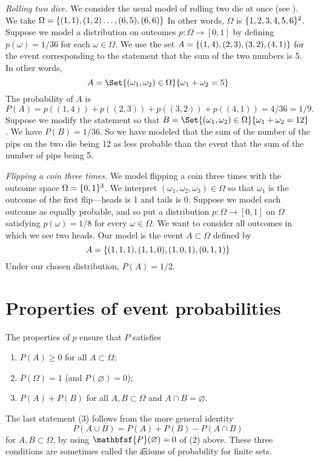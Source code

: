\textit{Rolling two dice.}
We consider the usual model of rolling two die at once (see ).
We take $\Omega  = \{(1,1), (1,2) \dots , (6,5), (6,6)\}$
In other words, $\Omega $ is $\{1,2,3,4,5,6\}^2$.
Suppose we model a distribution on outcomes $p: \Omega  \to [0,1]$ by defining $p(\omega ) = 1/36$ for each $\omega  \in \Omega $.
We use the set $A = \{(1,4), (2,3), (3, 2), (4,1)\}$ for the event corresponding to the statement that the sum of the two numbers is 5.
In other words,
\[
A = \Set{(\omega _1, \omega _2) \in \Omega }{ \omega _1 + \omega _2 = 5}
\]
The probability of $A$ is
\[
P(A) = p((1,4)) + p((2,3)) + p((3,2)) + p((4,1)) = 4/36 = 1/9.
\]
Suppose we modify the statement so that $B = \Set{(\omega _1,\omega _2) \in \Omega }{\omega _1 + \omega _2 = 12}$.
We have $P(B) = 1/36$.
So we have modeled that the sum of the number of the pips on the two die being 12 as less probable than the event that the sum of the number of pips being 5.

\textit{Flipping a coin three times.}
We model flipping a coin three times with the outcome space $\Omega  = \{0,1\}^3$.
We interpret $(\omega _1, \omega _2, \omega _3) \in \Omega $ so that $\omega _1$ is the outcome of the first flip---heads is 1 and tails is 0.
Suppose we model each outcome as equally probable, and so put a distribution $p: \Omega  \to [0,1]$ on $\Omega $ satisfying $p(\omega ) = 1/8$ for every $\omega  \in \Omega $.
We want to consider all outcomes in which we see two heads.
Our model is the event $A \subset \Omega $ defined by
\[
A = \{(1,1,1), (1,1,0), (1,0,1), (0,1,1)\}
\]
Under our chosen distribution, $P(A) = 1/2$.

\section*{Properties of event probabilities}

The properties of $p$ ensure that $P$ satisfies
    \begin{enumerate}
      \item $P(A) \geq 0$ for all $A \subset \Omega $;
      \item $P(\Omega ) = 1$ (and $P(\varnothing) = 0$);
      \item $P(A) + P(B)$ for all $A, B \subset \Omega $ and $A \cap  B = \varnothing$.
    \end{enumerate}
The last statement (3) follows from the more general identity
\[
P(A \cup B) = P(A) + P(B) - P(A \cap  B)
\]
for $A, B \subset \Omega $, by using $\mathbfsf{P} (\varnothing) = 0$ of (2) above.
These three conditions are sometimes called the \t{axioms of probability for finite sets}.

